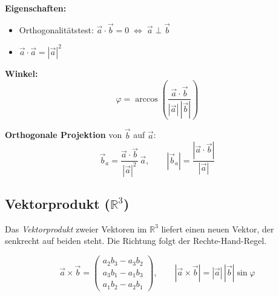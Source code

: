\begin{center}
\end{center}

\textbf{Eigenschaften:}
\begin{itemize}
     \item Orthogonalitätstest: $\vec a \cdot \vec b = 0 \;\Leftrightarrow\; \vec a \perp \vec b$
     \item $\vec a \cdot \vec a = |\vec a|^2$
\end{itemize}


\textbf{Winkel:}
\[
     \varphi = \arccos\!\left(\frac{\vec a \cdot \vec b}{|\vec a|\,|\vec b|}\right)
\]

\textbf{Orthogonale Projektion} von $\vec b$ auf $\vec a$:
\[
     \vec b_a = \frac{\vec a \cdot \vec b}{|\vec a|^2}\,\vec a, \qquad
     |\vec b_a| = \frac{|\vec a \cdot \vec b|}{|\vec a|}
\]

\subsection{Vektorprodukt ($\mathbb{R}^3$)}

Das \emph{Vektorprodukt} zweier Vektoren im $\mathbb{R}^3$ liefert einen neuen Vektor, der senkrecht auf beiden steht. Die Richtung folgt der Rechte-Hand-Regel.

\[
     \vec a \times \vec b =
     \begin{pmatrix} a_2b_3-a_3b_2 \\ a_3b_1-a_1b_3 \\ a_1b_2-a_2b_1 \end{pmatrix}, \qquad
     |\vec a \times \vec b| = |\vec a|\,|\vec b|\sin\varphi
\]

